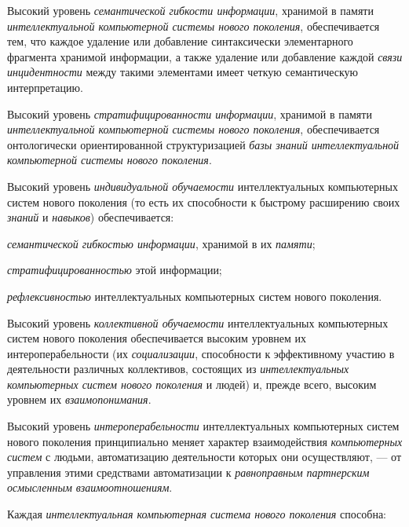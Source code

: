 Высокий уровень \textit{семантической гибкости информации}, хранимой в памяти \textit{интеллектуальной компьютерной системы нового поколения}, обеспечивается тем, что каждое удаление или добавление синтаксически элементарного фрагмента хранимой информации, а также удаление или добавление каждой \textit{связи инцидентности} между такими элементами имеет четкую семантическую интерпретацию.

Высокий уровень \textit{стратифицированности информации}, хранимой в памяти \textit{интеллектуальной компьютерной системы нового поколения}, обеспечивается онтологически ориентированной структуризацией \textit{базы знаний интеллектуальной компьютерной системы нового поколения}.

Высокий уровень \textit{индивидуальной обучаемости} интеллектуальных компьютерных систем нового поколения (то есть их способности к быстрому расширению своих \textit{знаний} и \textit{навыков}) обеспечивается:

\begin{textitemize}
	\item \textit{семантической гибкостью информации}, хранимой в их \textit{памяти};
	\item \textit{стратифицированностью} этой информации;
	\item \textit{рефлексивностью} интеллектуальных компьютерных систем нового поколения.
\end{textitemize}

Высокий уровень \textit{коллективной обучаемости} интеллектуальных компьютерных систем нового поколения обеспечивается высоким уровнем их интероперабельности (их \textit{социализации}, способности к эффективному участию в деятельности различных коллективов, состоящих из \textit{интеллектуальных компьютерных систем нового поколения} и людей) и, прежде всего, высоким уровнем их \textit{взаимопонимания}.

Высокий уровень \textit{интероперабельности} интеллектуальных компьютерных систем нового поколения принципиально меняет характер взаимодействия \textit{компьютерных систем} с людьми, автоматизацию деятельности которых они осуществляют, --- от управления этими средствами автоматизации к \textit{равноправным партнерским осмысленным взаимоотношениям}.

Каждая \textit{интеллектуальная компьютерная система нового поколения} способна:

